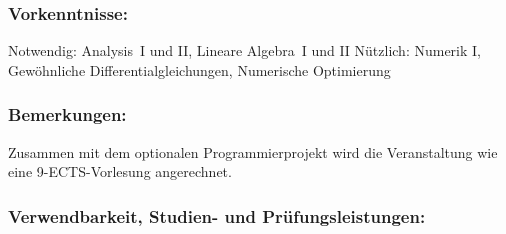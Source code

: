 \documentclass[a4paper,10pt]{article}
\begin{document}
\subsubsection*{\large
    Vorkenntnisse:
}
Notwendig: Analysis~I und II, Lineare Algebra~I und II 
Nützlich: Numerik I, Gewöhnliche Differentialgleichungen, Numerische Optimierung
\subsubsection*{\large
    Bemerkungen:
}
Zusammen mit dem optionalen Programmierprojekt wird die Veranstaltung  wie eine 9-ECTS-Vorlesung angerechnet.
\cleardoublepage
\subsubsection*{\large
    Verwendbarkeit, Studien- und Prüfungsleistungen:
}
\end{document}
